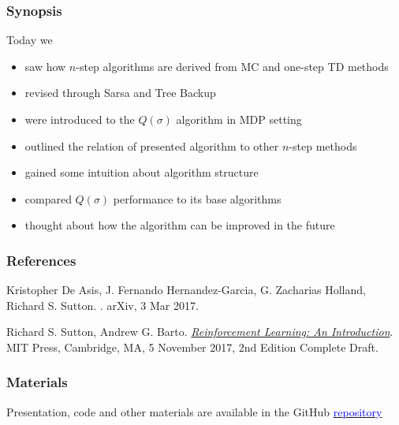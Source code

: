 \documentclass{beamer}
\begin{document}
\begin{frame}
  \frametitle{Synopsis}
  Today we
  \begin{itemize}
    \item saw how $n$-step algorithms are derived from MC and one-step TD
      methods
    \item revised through Sarsa and Tree Backup
    \item were introduced to the $Q(\sigma)$ algorithm in MDP setting
    \item outlined the relation of presented algorithm to other $n$-step methods
    \item gained some intuition about algorithm structure
    \item compared $Q(\sigma)$ performance to its base algorithms
    \item thought about how the algorithm can be improved in the future
  \end{itemize}
\end{frame}

\begin{frame}
  \frametitle<presentation>{References}

  \begin{thebibliography}{10}

  \beamertemplatebookbibitems

  \beamertemplatearticlebibitems

    Kristopher De Asis, J. Fernando Hernandez-Garcia, G. Zacharias Holland,
    Richard S. Sutton.
    .
    \newblock arXiv, 3 Mar 2017.

   Richard S. Sutton, Andrew G. Barto.
    \newblock
    {\href{http://incompleteideas.net/sutton/book/the-book-2nd.html}{\em
      Reinforcement Learning: An Introduction}}.
    \newblock MIT Press, Cambridge, MA, 5 November 2017, 2nd Edition Complete
      Draft.

  \end{thebibliography}
\end{frame}


\begin{frame}
  \frametitle{Materials}
  \begin{center}
  Presentation, code and other materials are available in the GitHub
  \href{https://github.com/omtcyfz/talks/tree/master/n-step-q-sigma}{
    \textcolor{blue}{repository}}
  \end{center}
\end{frame}

\end{document}
